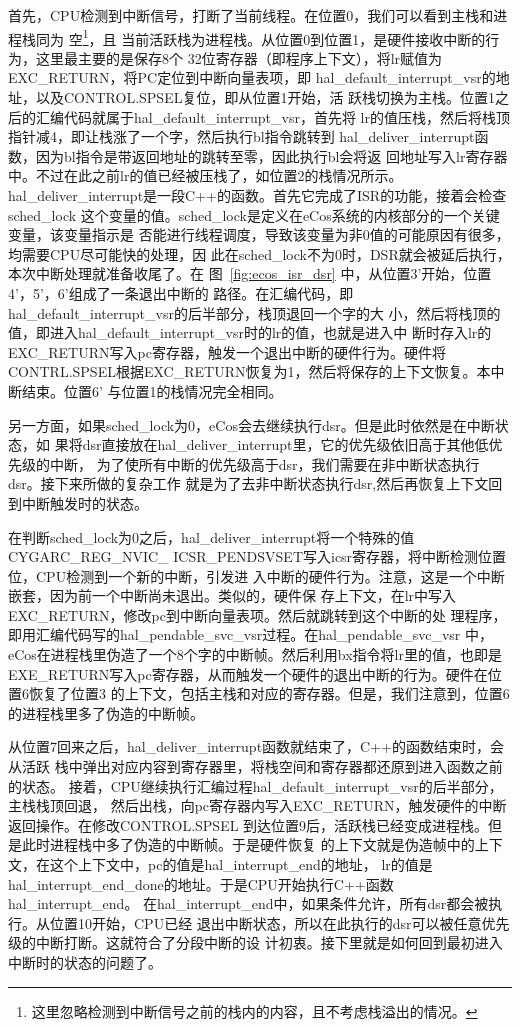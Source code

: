 首先，CPU检测到中断信号，打断了当前线程。在位置0，我们可以看到主栈和进程栈同为
空\footnote{这里忽略检测到中断信号之前的栈内的内容，且不考虑栈溢出的情况。}，且
当前活跃栈为进程栈。从位置0到位置1，是硬件接收中断的行为，这里最主要的是保存8个
32位寄存器（即程序上下文），将lr赋值为EXC\_RETURN，将PC定位到中断向量表项，即
hal\_default\_interrupt\_vsr的地址，以及CONTROL.SPSEL复位，即从位置1开始，活
跃栈切换为主栈。位置1之后的汇编代码就属于hal\_default\_interrupt\_vsr，首先将
lr的值压栈，然后将栈顶指针减4，即让栈涨了一个字，然后执行bl指令跳转到
hal\_deliver\_interrupt函数，因为bl指令是带返回地址的跳转至零，因此执行bl会将返
回地址写入lr寄存器中。不过在此之前lr的值已经被压栈了，如位置2的栈情况所示。
hal\_deliver\_interrupt是一段C++的函数。首先它完成了ISR的功能，接着会检查sched\_lock
这个变量的值。sched\_lock是定义在eCos系统的内核部分的一个关键变量，该变量指示是
否能进行线程调度，导致该变量为非0值的可能原因有很多，均需要CPU尽可能快的处理，因
此在sched\_lock不为0时，DSR就会被延后执行，本次中断处理就准备收尾了。在
图~\ref{fig:ecos_isr_dsr} 中，从位置3'开始，位置4'，5'，6'组成了一条退出中断的
路径。在汇编代码，即hal\_default\_interrupt\_vsr的后半部分，栈顶退回一个字的大
小，然后将栈顶的值，即进入hal\_default\_interrupt\_vsr时的lr的值，也就是进入中
断时存入lr的EXC\_RETURN写入pc寄存器，触发一个退出中断的硬件行为。硬件将
CONTRL.SPSEL根据EXC\_RETURN恢复为1，然后将保存的上下文恢复。本中断结束。位置6'
与位置1的栈情况完全相同。

另一方面，如果sched\_lock为0，eCos会去继续执行dsr。但是此时依然是在中断状态，如
果将dsr直接放在hal\_deliver\_interrupt里，它的优先级依旧高于其他低优先级的中断，
为了使所有中断的优先级高于dsr，我们需要在非中断状态执行dsr。接下来所做的复杂工作
就是为了去非中断状态执行dsr,然后再恢复上下文回到中断触发时的状态。

在判断sched\_lock为0之后，hal\_deliver\_interrupt将一个特殊的值CYGARC\_REG\_NVIC\_
ICSR\_PENDSVSET写入icsr寄存器，将中断检测位置位，CPU检测到一个新的中断，引发进
入中断的硬件行为。注意，这是一个中断嵌套，因为前一个中断尚未退出。类似的，硬件保
存上下文，在lr中写入EXC\_RETURN，修改pc到中断向量表项。然后就跳转到这个中断的处
理程序，即用汇编代码写的hal\_pendable\_svc\_vsr过程。在hal\_pendable\_svc\_vsr
中，eCos在进程栈里伪造了一个8个字的中断帧。然后利用bx指令将lr里的值，也即是
EXE\_RETURN写入pc寄存器，从而触发一个硬件的退出中断的行为。硬件在位置6恢复了位置3
的上下文，包括主栈和对应的寄存器。但是，我们注意到，位置6的进程栈里多了伪造的中断帧。

从位置7回来之后，hal\_deliver\_interrupt函数就结束了，C++的函数结束时，会从活跃
栈中弹出对应内容到寄存器里，将栈空间和寄存器都还原到进入函数之前的状态。\cite{AAPCS}
接着，CPU继续执行汇编过程hal\_default\_interrupt\_vsr的后半部分，主栈栈顶回退，
然后出栈，向pc寄存器内写入EXC\_RETURN，触发硬件的中断返回操作。在修改CONTROL.SPSEL
到达位置9后，活跃栈已经变成进程栈。但是此时进程栈中多了伪造的中断帧。于是硬件恢复
的上下文就是伪造帧中的上下文，在这个上下文中，pc的值是hal\_interrupt\_end的地址，
lr的值是hal\_interrupt\_end\_done的地址。于是CPU开始执行C++函数hal\_interrupt\_end。
在hal\_interrupt\_end中，如果条件允许，所有dsr都会被执行。从位置10开始，CPU已经
退出中断状态，所以在此执行的dsr可以被任意优先级的中断打断。这就符合了分段中断的设
计初衷。接下里就是如何回到最初进入中断时的状态的问题了。

